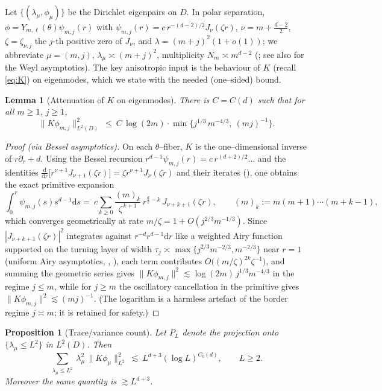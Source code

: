 \documentclass[11pt]{article}
\newtheorem{lemma}[theorem]{Lemma}
\newtheorem{proposition}[theorem]{Proposition}
\newcommand{\1}{\mathbf{1}}
\newcommand{\norm}[1]{\lVert #1\rVert}
\newcommand{\ddd}{\mathrm{d}}
\begin{document}
Let $\{(\lambda_\mu,\phi_\mu)\}$ be the Dirichlet eigenpairs on $D$. In polar
separation, $\phi=Y_{m,\ell}(\theta)\psi_{m,j}(r)$ with
$\psi_{m,j}(r)=c\,r^{-(d-2)/2}J_\nu(\zeta r)$, $\nu=m+\tfrac{d-2}2$, $\zeta=\zeta_{\nu,j}$
the $j$-th positive zero of $J_\nu$, and $\lambda=(m+j)^2(1+o(1))$; we abbreviate
$\mu=(m,j)$, $\lambda_\mu\asymp(m+j)^2$, multiplicity $N_m\asymp m^{d-2}$
(\cite[Ch.~XVIII]{Watson}; see also \cite{Triebel} for the Weyl asymptotics).
The key anisotropic input is the behaviour of $K$ (recall \eqref{eq:K}) on eigenmodes,
which we state with the needed (one--sided) bound.

\begin{lemma}[Attenuation of $K$ on eigenmodes]\label{lem:Kmodes}
There is $C=C(d)$ such that for all $m\ge 1$, $j\ge 1$,
\begin{equation}\label{eq:Kmode}
\norm{K\phi_{m,j}}^2_{L^2(D)}\ \le\ C\,\log(2m)\cdot\min\Big\{j^{1/3}\,m^{-4/3},\ (m j)^{-1}\Big\}.
\end{equation}
\end{lemma}

\begin{proof}[Proof (via Bessel asymptotics)]
On each $\theta$--fiber, $K$ is the one--dimensional inverse of $r\partial_r+d$.
Using the Bessel recursion
$r^{d-1}\psi_{m,j}(r)=c\,r^{(d+2)/2}\dots$ and the identities
$\frac{\ddd}{\ddd r}\big[r^{\nu+1}J_{\nu+1}(\zeta r)\big]=\zeta r^{\nu+1}J_\nu(\zeta r)$
and their iterates (\cite[Ch.~III, \S3.2]{Watson}), one obtains the exact primitive
expansion
\[
\int_0^r\psi_{m,j}(s)s^{d-1}\ddd s
=\ c\sum_{k\ge0}\frac{(m)_k}{\zeta^{\,k+1}}\,r^{\frac d2-k}\,J_{\nu+k+1}(\zeta r),
\qquad (m)_k:=m(m+1)\cdots(m+k-1),
\]
which converges geometrically at rate $m/\zeta=1+O(j^{2/3}m^{-1/3})$.
Since $|J_{\nu+k+1}(\zeta r)|^2$ integrates against $r^{-d}r^{d-1}\ddd r$
like a weighted Airy function supported on the turning layer of width
$\tau_j\asymp\max\{j^{2/3}m^{-2/3},m^{-2/3}\}$ near $r=1$ (uniform Airy
asymptotics, \cite[Ch.~11]{Olver}, \cite{Watson}), each term contributes
$O\big((m/\zeta)^{2k}\zeta^{-1}\big)$, and summing the geometric series gives
$\norm{K\phi_{m,j}}^2\lesssim \log(2m)\,j^{1/3}m^{-4/3}$ in the regime $j\le m$,
while for $j\ge m$ the oscillatory cancellation in the primitive gives
$\norm{K\phi_{m,j}}^2\lesssim (mj)^{-1}$. (The logarithm is a harmless artefact of the
border regime $j\asymp m$; it is retained for safety.)
\end{proof}

\begin{proposition}[Trace/variance count]\label{prop:variance}
Let $P_L$ denote the projection onto $\{\lambda_\mu\le L^2\}$ in $L^2(D)$. Then
\begin{equation}\label{eq:variancecount}
\sum_{\lambda_\mu\le L^2}\ \lambda_\mu^2\,\norm{K\phi_\mu}_{L^2}^2
\ \lesssim\ L^{d+3}(\log L)^{C_0(d)},\qquad L\ge2 .
\end{equation}
Moreover the same quantity is $\gtrsim L^{d+3}$.
\end{proposition}
\end{document}
